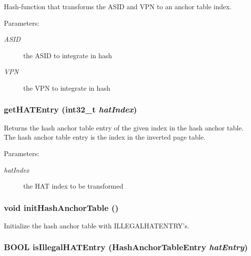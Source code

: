 Hash-function that transforms the ASID and VPN to an anchor table index. \begin{Desc}
\item[Parameters:]
\begin{description}
\item[{\em ASID}]the ASID to integrate in hash \item[{\em VPN}]the VPN to integrate in hash \end{description}
\end{Desc}
\hypertarget{group___v_m_m___h_a_t_g6d77bf5eb6d8b03e762b5b5c4f82a3d9}{
\subsubsection[{getHATEntry}]{ getHATEntry (int32\_\-t {\em hatIndex})}}
\label{group___v_m_m___h_a_t_g6d77bf5eb6d8b03e762b5b5c4f82a3d9}


Returns the hash anchor table entry of the given index in the hash anchor table. The hash anchor table entry is the index in the inverted page table. \begin{Desc}
\item[Parameters:]
\begin{description}
\item[{\em hatIndex}]the HAT index to be transformed \end{description}
\end{Desc}
\hypertarget{group___v_m_m___h_a_t_ge31a05f91c4fb2cb19f80de59672a3fc}{
\subsubsection[{initHashAnchorTable}]{\setlength{\rightskip}{0pt plus 5cm}void initHashAnchorTable ()}}
\label{group___v_m_m___h_a_t_ge31a05f91c4fb2cb19f80de59672a3fc}


Initialize the hash anchor table with ILLEGALHATENTRY's. \hypertarget{group___v_m_m___h_a_t_g103d7fcf856a6ff6afb186439d1c308e}{
\subsubsection[{isIllegalHATEntry}]{\setlength{\rightskip}{0pt plus 5cm}BOOL isIllegalHATEntry ({\bf HashAnchorTableEntry} {\em hatEntry})}}
\label{group___v_m_m___h_a_t_g103d7fcf856a6ff6afb186439d1c308e}



